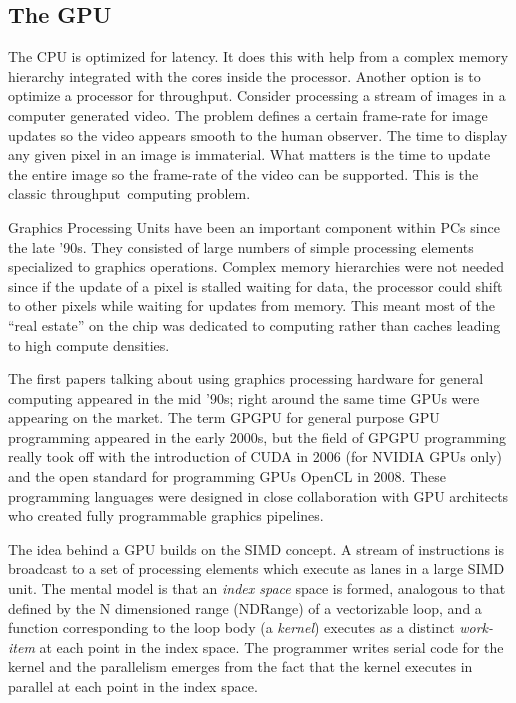 %
%
   
   
\subsection{The GPU}

The CPU is optimized for latency.   It does this with help from a complex memory hierarchy integrated with the cores
inside the processor.  Another option is to optimize a processor for throughput.  Consider processing a stream of images
in a computer generated video.   The problem defines a certain frame-rate for image updates so the video appears smooth to the human
observer.  The time to display any given pixel in an image is immaterial.  What matters is the time to update the entire
image so the frame-rate of the video can be supported.  This is the classic throughput~computing problem.  

Graphics Processing Units have been an important component within PCs since the late '90s.  They consisted of large numbers of
simple processing elements specialized to graphics operations.  Complex memory hierarchies were not needed since if the
update of a pixel is stalled waiting for data, the processor could shift to other pixels while waiting for updates from memory.
This meant most of the ``real estate'' on the chip was dedicated to computing rather than caches leading to high compute densities.

The first papers talking about using graphics processing hardware for general computing appeared in the mid '90s; right around the
same time GPUs were appearing on the market.  The term GPGPU for general purpose GPU programming appeared in the early 2000s, but the
field of GPGPU programming really took off with the introduction of CUDA in 2006 (for NVIDIA GPUs only) and the open standard for 
programming GPUs OpenCL in 2008.  These programming languages were designed in close collaboration with GPU architects who
created fully programmable graphics pipelines.

The idea behind a GPU builds on the SIMD concept.  A stream of instructions is broadcast to a set of processing 
elements which execute as lanes in a large SIMD unit.  The mental model is that an \emph{index space} space is formed, analogous 
to that defined by the N dimensioned range (NDRange) of a vectorizable loop, and a function corresponding 
to the loop body (a \emph{kernel}) executes as a distinct
\emph{work-item} at each point in the index space.  The programmer writes serial code for the kernel and the parallelism emerges
from the fact that the kernel executes in parallel at each point in the index space.

